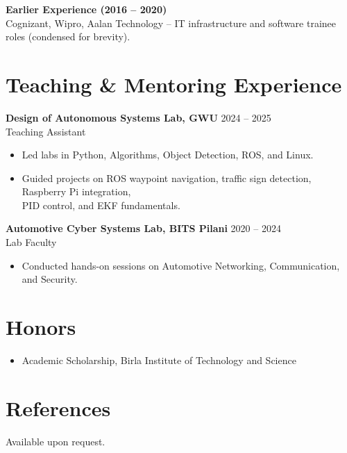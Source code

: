 \documentclass[a4paper,11pt]{article}
\begin{document}
\noindent
\textbf{Earlier Experience (2016 -- 2020)} \\
Cognizant, Wipro, Aalan Technology -- IT infrastructure and software trainee roles (condensed for brevity).

\section*{Teaching \& Mentoring Experience}

\textbf{Design of Autonomous Systems Lab, GWU} \hfill 2024 -- 2025\\
Teaching Assistant
\begin{itemize}
    \item Led labs in Python, Algorithms, Object Detection, ROS, and Linux.
    \item Guided projects on ROS waypoint navigation, traffic sign detection, Raspberry Pi integration,\\ PID control, and EKF fundamentals.
\end{itemize}

\noindent
\textbf{Automotive Cyber Systems Lab, BITS Pilani} \hfill 2020 -- 2024\\
Lab Faculty
\begin{itemize}
    \item Conducted hands-on sessions on Automotive Networking, Communication, and Security.
\end{itemize}

\section*{Honors}
\begin{itemize}
    \item Academic Scholarship, Birla Institute of Technology and Science
\end{itemize}

\section*{References}
Available upon request.
\end{document}
